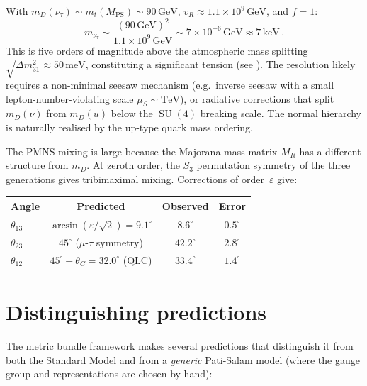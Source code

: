 \documentclass[12pt,a4paper]{article}
\theoremstyle{definition}
\newcommand{\SU}{\operatorname{SU}}
\newcommand{\MPS}{M_{\mathrm{PS}}}
\begin{document}
With $m_D(\nu_\tau) \sim m_t(\MPS) \sim 90\,\mathrm{GeV}$, $v_R \approx 1.1 \times 10^{9}\,\mathrm{GeV}$, and $f = 1$:
\begin{equation}
m_{\nu_\tau} \sim \frac{(90\,\mathrm{GeV})^2}{1.1 \times 10^{9}\,\mathrm{GeV}} \sim 7 \times 10^{-6}\,\mathrm{GeV} \approx 7\,\mathrm{keV}\,.
\end{equation}
This is five orders of magnitude above the atmospheric mass splitting $\sqrt{\Delta m^2_{31}} \approx 50\,\mathrm{meV}$, constituting a significant tension (see ).
The resolution likely requires a non-minimal seesaw mechanism (e.g.\ inverse seesaw with a small lepton-number-violating scale $\mu_S \sim \mathrm{TeV}$), or radiative corrections that split $m_D(\nu)$ from $m_D(u)$ below the $\SU(4)$ breaking scale.
The normal hierarchy is naturally realised by the up-type quark mass ordering.

The PMNS mixing is large because the Majorana mass matrix $M_R$ has a different structure from $m_D$.
At zeroth order, the $S_3$ permutation symmetry of the three generations gives tribimaximal mixing.
Corrections of order~$\varepsilon$ give:
\begin{center}
\renewcommand{\arraystretch}{1.3}
\begin{tabular}{lccc}
\toprule
\textbf{Angle} & \textbf{Predicted} & \textbf{Observed} & \textbf{Error} \\
\midrule
$\theta_{13}$ & $\arcsin(\varepsilon/\sqrt{2}) = 9.1^\circ$ & $8.6^\circ$ & $0.5^\circ$ \\
$\theta_{23}$ & $45^\circ$ ($\mu$-$\tau$ symmetry) & $42.2^\circ$ & $2.8^\circ$ \\
$\theta_{12}$ & $45^\circ - \theta_C = 32.0^\circ$ (QLC) & $33.4^\circ$ & $1.4^\circ$ \\
\bottomrule
\end{tabular}
\end{center}


\section{Distinguishing predictions}
\label{sec:predictions}

The metric bundle framework makes several predictions that distinguish it from both the Standard Model and from a \emph{generic} Pati-Salam model (where the gauge group and representations are chosen by hand):
\end{document}
